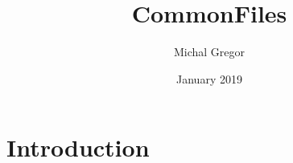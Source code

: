 \documentclass{article}
\title{CommonFiles}
\author{Michal Gregor}
\date{January 2019}
\begin{document}
\maketitle

\section{Introduction}
\end{document}
